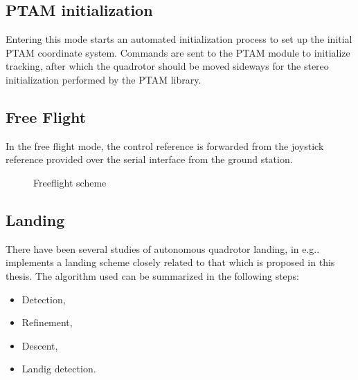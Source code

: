         \subsection{PTAM initialization}
            Entering this mode starts an automated initialization process
            to set up the initial PTAM coordinate system. Commands are sent
            to the PTAM module to initialize tracking, after which
            the quadrotor should be moved sideways for the
            stereo initialization performed by the PTAM library.


        \subsection{Free Flight}
            In the free flight mode, the control reference is forwarded
            from the joystick reference provided over the serial interface
            from the ground station.

            \begin{figure}[h]
                \noindent{}
                \caption{Freeflight scheme}
                \label{fig:logic:freeflightscheme}
            \end{figure}

        \subsection{Landing}
            \label{ssec:logic:landing}
            There have been several studies of autonomous quadrotor landing,
            in e.g.\citep{mellinger10perching,brockers:803111}.
            \citep{brockers:803111} implements a landing scheme closely related to
            that which is proposed in this thesis.
            The algorithm used can be summarized in the following steps:
            \begin{itemize}
                \item Detection,
                \item Refinement,
                \item Descent,
                \item Landig detection.
            \end{itemize}

